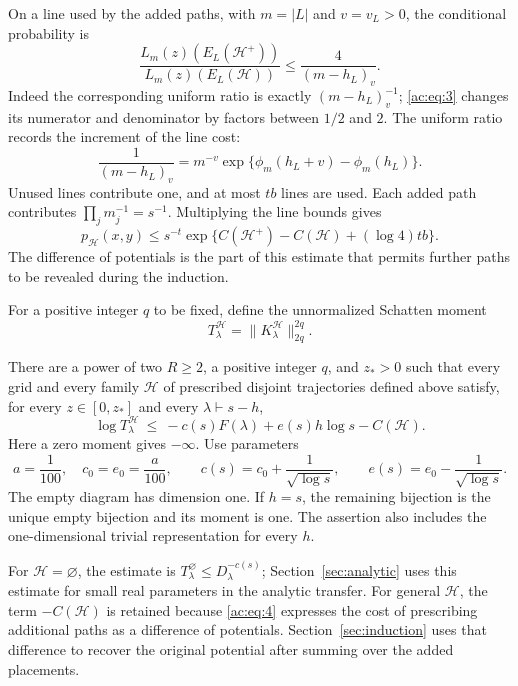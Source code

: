 On a line used by the added paths, with \(m=|L|\) and \(v=v_L>0\), the
conditional probability is
\[
 \frac{L_m(z)(E_L(\mathcal H^+))}
      {L_m(z)(E_L(\mathcal H))}
 \le \frac4{(m-h_L)_v}.
\]
Indeed the corresponding uniform ratio is exactly \((m-h_L)_v^{-1}\);
\eqref{ac:eq:3} changes its numerator and denominator by factors between
\(1/2\) and \(2\). The uniform ratio records the increment of the line cost:
\[
 \frac1{(m-h_L)_v}
 =m^{-v}\exp\{\phi_m(h_L+v)-\phi_m(h_L)\}.
\]
Unused lines contribute one, and at most \(tb\) lines are used. Each added
path contributes \(\prod_jm_j^{-1}=s^{-1}\). Multiplying the line bounds gives
\begin{equation}
 p_{\mathcal H}(x,y)
 \le s^{-t}\exp\{C(\mathcal H^+)-C(\mathcal H)+(\log4)tb\}.
 \label{ac:eq:4}
\end{equation}
The difference of potentials is the part of this estimate that permits
further paths to be revealed during the induction.

For a positive integer \(q\) to be fixed, define the unnormalized Schatten
moment
\[
 T_\lambda^{\mathcal H}=\|K_\lambda^{\mathcal H}\|_{2q}^{2q}.
\]

\begin{samepage}
\begin{theorem}
There\label{thm:conditional}\label{ac:main} are a power of two \(R\ge2\), a positive integer \(q\), and \(z_*>0\) such
that every grid and every family \(\mathcal H\) of prescribed disjoint
trajectories defined above satisfy, for every \(z\in[0,z_*]\) and every
\(\lambda\vdash s-h\),
\begin{equation}
 \log T_\lambda^{\mathcal H}\ \le\
 -c(s)F(\lambda)+e(s)h\log s-C(\mathcal H).
 \label{ac:eq:15}
\end{equation}
Here a zero moment gives \(-\infty\). Use parameters
\[
 a=\frac1{100},\quad c_0=e_0=\frac a{100},\qquad
 c(s)=c_0+\frac1{\sqrt{\log s}},\qquad
 e(s)=e_0-\frac1{\sqrt{\log s}}.
\]
The empty diagram has dimension one. If \(h=s\), the remaining bijection is
the unique empty bijection and its moment is one. The assertion also includes
the one-dimensional trivial representation for every \(h\).
\end{theorem}
\end{samepage}

For \(\mathcal H=\varnothing\), the estimate is
\(T_\lambda^\varnothing\le D_\lambda^{-c(s)}\); Section~\ref{sec:analytic}
uses this estimate for small real parameters in the analytic transfer. For general
\(\mathcal H\), the term \(-C(\mathcal H)\) is retained because
\eqref{ac:eq:4} expresses the cost of prescribing additional paths as a difference of
potentials. Section~\ref{sec:induction} uses that difference to recover the
original potential after summing over the added placements.
